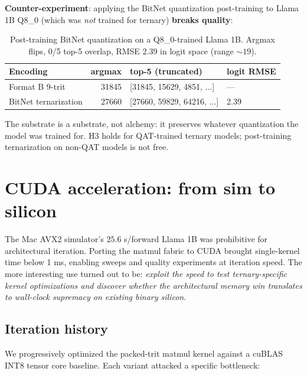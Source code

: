 \documentclass{article}
\begin{document}
\textbf{Counter-experiment}: applying the BitNet quantization
post-training to Llama 1B Q8\_0 (which was \emph{not} trained for ternary)
\textbf{breaks quality}:

\begin{table}[h]
\centering
\begin{tabular}{lrll}
\toprule
Encoding & argmax & top-5 (truncated) & logit {RMSE} \\
\midrule
Format B 9-trit & 31845 & [31845, 15629, 4851, ...] & --- \\
BitNet ternarization & 27660 & [27660, 59829, 64216, ...] & 2.39 \\
\bottomrule
\end{tabular}
\caption{Post-training BitNet quantization on a Q8\_0-trained Llama 1B.
Argmax flips, 0/5 top-5 overlap, RMSE 2.39 in logit space (range
$\sim 19$).}
\end{table}

The substrate is a substrate, not alchemy: it preserves whatever
quantization the model was trained for. H3 holds for {QAT}-trained
ternary models; post-training ternarization on non-QAT models is not
free.

\section{{CUDA} acceleration: from sim to silicon} \label{sec:cuda}

The Mac {AVX2} simulator's $25.6$ s/forward Llama 1B was prohibitive
for architectural iteration. Porting the matmul fabric to {CUDA}
\citep{cuda-dp4a, cublas} brought single-kernel time below 1 ms,
enabling sweeps and quality experiments at iteration speed. The more
interesting use turned out to be: \emph{exploit the speed to test
ternary-specific kernel optimizations and discover whether the
architectural memory win translates to wall-clock supremacy on existing
binary silicon}.

\subsection{Iteration history}

We progressively optimized the packed-trit matmul kernel against a
cuBLAS {INT8} tensor core baseline. Each variant attacked a specific
bottleneck:
\end{document}
